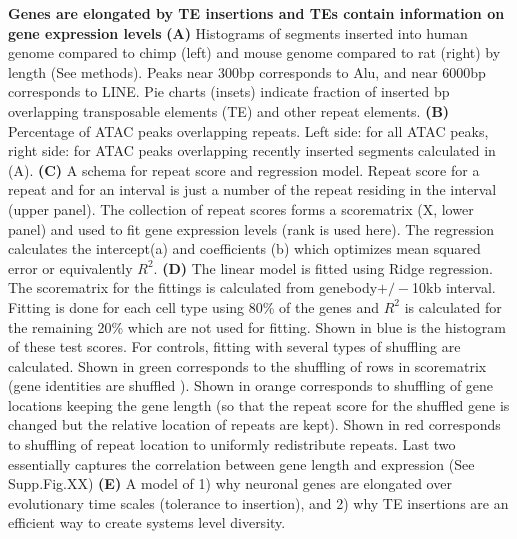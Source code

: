 \textbf{Genes are elongated by TE insertions and TEs contain information on gene expression levels}
\textbf{(A)} Histograms of segments inserted into human genome compared to chimp (left) and mouse genome compared to rat (right) by length (See methods). Peaks near 300bp corresponds to Alu, and near 6000bp corresponds to LINE. Pie charts (insets) indicate fraction of inserted bp overlapping transposable elements (TE) and other repeat elements.
\textbf{(B)} Percentage of ATAC peaks overlapping repeats. Left side: for all ATAC peaks, right side: for ATAC peaks overlapping recently inserted segments calculated in (A). 
\textbf{(C)} A schema for repeat score and regression model. Repeat score for a repeat and for an interval is just a number of the repeat residing in the interval (upper panel). The collection of repeat scores forms a scorematrix (X, lower panel) and used to fit gene expression levels (rank is used here). The regression calculates the intercept(a) and coefficients (b) which optimizes mean squared error or equivalently $R^2$. 
\textbf{(D)} The linear model is fitted using Ridge regression. The scorematrix for the fittings is calculated from genebody$+/-$10kb interval. Fitting is done for each cell type using 80\% of the genes and $R^2$ is calculated for the remaining 20\% which are not used for fitting. Shown in blue is the histogram of these test scores. For controls, fitting with several types of shuffling are calculated. Shown in green corresponds to the shuffling of rows in scorematrix (gene identities are shuffled ). Shown in orange corresponds to shuffling of gene locations keeping the gene length (so that the repeat score for the shuffled gene is changed but the relative location of repeats are kept). Shown in red corresponds to shuffling of repeat location to uniformly redistribute repeats. Last two essentially captures the correlation between gene length and expression (See Supp.Fig.XX)
\textbf{(E)} A model of 1) why neuronal genes are elongated over evolutionary time scales (tolerance to insertion), and 2) why TE insertions are an efficient way to create systems level diversity. 
